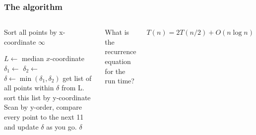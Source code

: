\begin{frame}
	\frametitle{The algorithm}
	\begin{columns}
	\begin{algorithmic}
		\State Sort all points by x-coordinate
				\State \Return $\infty$
			\EndIf

			\pause
			\State $L \gets$ \alert<2>{median} $x$-coordinate
			\State $\delta_1 \gets$ 
			\State $\delta_2 \gets$ 
			\State $\delta \gets \min(\delta_1,\delta_2)$
			\pause
			\State get list of all points within $\delta$ from L.
			\State sort this list by y-coordinate
			\pause
			\State Scan by y-order, compare every point to the next 11 and update $\delta$ as you go.
			\State \Return $\delta$
		\EndFunction
	\end{algorithmic}
		\pause
		\begin{questionblock}{}
			What is the recurrence equation for the run time?	
		\end{questionblock}	
		\pause
		\begin{answerblock}{}
			\small
			$T(n) =2T(n/2) + O(n\log n)$	
		\end{answerblock}
	\end{columns}
	
\end{frame}
